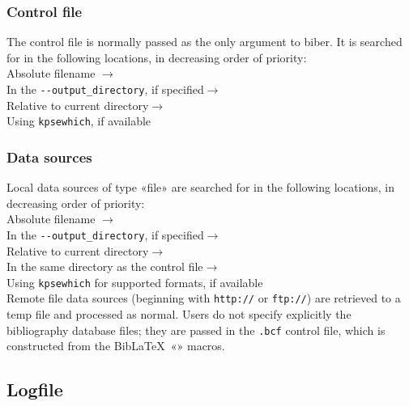 \documentclass{ltxdockit}
\begin{document}
\subsubsection{Control file}\label{loc:cf}

The control file is normally passed as the only argument to biber. It is
searched for in the following locations, in decreasing order of
priority:\\[2ex]

\noindent Absolute filename $\rightarrow$\\
\hspace*{1em}In the \verb+--output_directory+, if specified$\rightarrow$\\
\hspace*{2em}Relative to current directory$\rightarrow$\\
\hspace*{3em}Using \verb+kpsewhich+, if available

\subsubsection{Data sources}

Local data sources of type «file» are searched for in the following
locations, in decreasing order of priority:\\[2ex]

\noindent Absolute filename $\rightarrow$\\
\hspace*{1em}In the \verb+--output_directory+, if specified$\rightarrow$\\
\hspace*{2em}Relative to current directory$\rightarrow$\\
\hspace*{3em}In the same directory as the control file$\rightarrow$\\
\hspace*{4em}Using \verb+kpsewhich+ for supported formats, if available\\[2ex]

\noindent Remote file data sources (beginning with \verb+http://+ or
\verb+ftp://+) are retrieved to a temp file and processed as normal. Users
do not specify explicitly the bibliography database files; they are passed
in the \verb+.bcf+ control file, which is constructed from the
Bib\LaTeX\ «\verb++» macros.

\subsection{Logfile}
\end{document}
